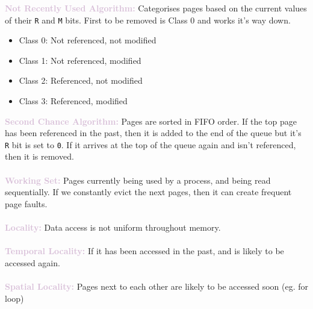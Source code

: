 \documentclass[a4paper,10pt]{article}
\begin{document}
\textcolor{Thistle}{\textbf{Not Recently Used Algorithm:}} Categorises pages based on the current values of their \texttt{R} and \texttt{M} bits. First to be removed is Class 0 and works it's way down.
\begin{itemize}
\item Class 0: Not referenced, not modified 
\item Class 1: Not referenced, modified
\item Class 2: Referenced, not modified 
\item Class 3: Referenced, modified 
\end{itemize}
\textcolor{Thistle}{\textbf{Second Chance Algorithm:}} Pages are sorted in FIFO order. If the top page has been referenced in the past, then it is added to the end of the queue but it's \texttt{R} bit is set to \texttt{0}. If it arrives at the top of the queue again and isn't referenced, then it is removed. \\\\
\textcolor{Thistle}{\textbf{Working Set:}} Pages currently being used by a process, and being read sequentially. If we constantly evict the next pages, then it can create frequent page faults. \\\\
\textcolor{Thistle}{\textbf{Locality:}} Data access is not uniform throughout memory. \\\\
\textcolor{Thistle}{\textbf{Temporal Locality:}} If it has been accessed in the past, and is likely to be accessed again. \\\\
\textcolor{Thistle}{\textbf{Spatial Locality:}} Pages next to each other are likely to be accessed soon (eg. for loop) \\\\
\end{document}
